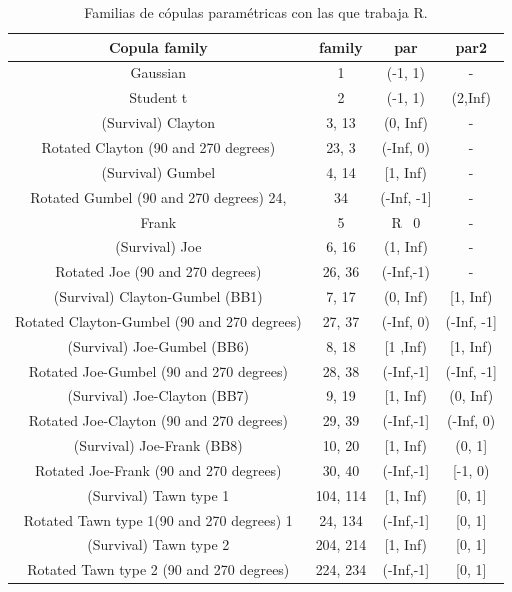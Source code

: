 \begin{table}[H]
    \centering
    \begin{tabular}{||c|c|c|c||}
    \hline\hline
\textbf{Copula family}	       & \textbf{family}    & \textbf{par}	    & \textbf{par2}      \\\hline
Gaussian	                                & 1	        & (-1, 1)	& -         \\
Student t	                                & 2	        & (-1, 1)	& (2,Inf)   \\
(Survival) Clayton	                        & 3, 13	    & (0, Inf)	& -         \\
Rotated Clayton (90 and 270 degrees)	    & 23, 3     & (-Inf, 0)	& -         \\
(Survival) Gumbel	                        & 4, 14	    & [1, Inf)	& -         \\
Rotated Gumbel (90 and 270 degrees)	24,     & 34	    & (-Inf, -1]& -         \\
Frank	                                    & 5	        & R \ {0}	& -         \\
(Survival) Joe	                            & 6, 16	    & (1, Inf)	& -         \\
Rotated Joe (90 and 270 degrees)	        & 26, 36    & (-Inf,-1)	& -         \\
(Survival) Clayton-Gumbel (BB1)	            & 7, 17	    & (0, Inf)	& [1, Inf)  \\
Rotated Clayton-Gumbel (90 and 270 degrees)	& 27, 37	& (-Inf, 0)	& (-Inf, -1]\\
(Survival) Joe-Gumbel (BB6)	                & 8, 18	    & [1 ,Inf)	& [1, Inf)  \\
Rotated Joe-Gumbel (90 and 270 degrees)	    & 28, 38	& (-Inf,-1]	& (-Inf, -1]\\
(Survival) Joe-Clayton (BB7)	            & 9, 19	    & [1, Inf)	& (0, Inf)  \\
Rotated Joe-Clayton (90 and 270 degrees)	& 29, 39	& (-Inf,-1]	& (-Inf, 0) \\
(Survival) Joe-Frank (BB8)	                & 10, 20	& [1, Inf)	& (0, 1]    \\
Rotated Joe-Frank (90 and 270 degrees)	    & 30, 40	& (-Inf,-1] & [-1, 0)   \\
(Survival) Tawn type 1	                    & 104, 114	& [1, Inf)	& [0, 1]    \\
Rotated Tawn type 1(90 and 270 degrees)	1   & 24, 134	& (-Inf,-1]	& [0, 1]    \\
(Survival) Tawn type 2	                    & 204, 214	& [1, Inf)	& [0, 1]    \\ 
Rotated Tawn type 2 (90 and 270 degrees)	& 224, 234	& (-Inf,-1]	& [0, 1]    \\ \hline \hline
    \end{tabular}
    \caption{Familias de cópulas paramétricas con las que trabaja R.}
    \label{tab:family_set}
\end{table}

